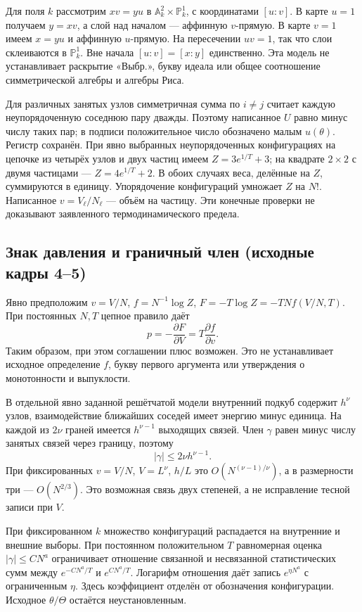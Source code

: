 \documentclass[11pt]{article}
\begin{document}
Для поля \(k\) рассмотрим \(xv=yu\) в \(\mathbb A^2_k\times\mathbb P^1_k\), с координатами \([u:v]\). В карте \(u=1\) получаем \(y=xv\), а слой над началом — аффинную \(v\)-прямую. В карте \(v=1\) имеем \(x=yu\) и аффинную \(u\)-прямую. На пересечении \(uv=1\), так что слои склеиваются в \(\mathbb P^1_k\). Вне начала \([u:v]=[x:y]\) единственно. Эта модель не устанавливает раскрытие «Выбр.», букву идеала или общее соотношение симметрической алгебры и алгебры Риса.

Для различных занятых узлов симметричная сумма по \(i\ne j\) считает каждую неупорядоченную соседнюю пару дважды. Поэтому написанное \(U\) равно минус числу таких пар; в подписи положительное число обозначено малым \(u(\theta)\). Регистр сохранён. При явно выбранных неупорядоченных конфигурациях на цепочке из четырёх узлов и двух частиц имеем \(Z=3e^{1/T}+3\); на квадрате \(2\times2\) с двумя частицами — \(Z=4e^{1/T}+2\). В обоих случаях веса, делённые на \(Z\), суммируются в единицу. Упорядочение конфигураций умножает \(Z\) на \(N!\). Написанное \(v=V_\ell/N_\ell\) — объём на частицу. Эти конечные проверки не доказывают заявленного термодинамического предела.

\subsection*{Знак давления и граничный член (исходные кадры 4–5)}
Явно предположим \(v=V/N\), \(f=N^{-1}\log Z\), \(F=-T\log Z=-TNf(V/N,T)\). При постоянных \(N,T\) цепное правило даёт
\[p=-\frac{\partial F}{\partial V}=T\frac{\partial f}{\partial v}.\]
Таким образом, при этом соглашении плюс возможен. Это не устанавливает исходное определение \(f\), букву первого аргумента или утверждения о монотонности и выпуклости.

В отдельной явно заданной решётчатой модели внутренний подкуб содержит \(h^\nu\) узлов, взаимодействие ближайших соседей имеет энергию минус единица. На каждой из \(2\nu\) граней имеется \(h^{\nu-1}\) выходящих связей. Член \(\gamma\) равен минус числу занятых связей через границу, поэтому
\[|\gamma|\le 2\nu h^{\nu-1}.\]
При фиксированных \(v=V/N\), \(V=L^\nu\), \(h/L\) это \(O(N^{(\nu-1)/\nu})\), а в размерности три — \(O(N^{2/3})\). Это возможная связь двух степеней, а не исправление тесной записи при \(V\).

При фиксированном \(k\) множество конфигураций распадается на внутренние и внешние выборы. При постоянном положительном \(T\) равномерная оценка \(|\gamma|\le CN^a\) ограничивает отношение связанной и несвязанной статистических сумм между \(e^{-CN^a/T}\) и \(e^{CN^a/T}\). Логарифм отношения даёт запись \(e^{\eta N^a}\) с ограниченным \(\eta\). Здесь коэффициент отделён от обозначения конфигурации. Исходное \(\theta/\Theta\) остаётся неустановленным.
\end{document}
